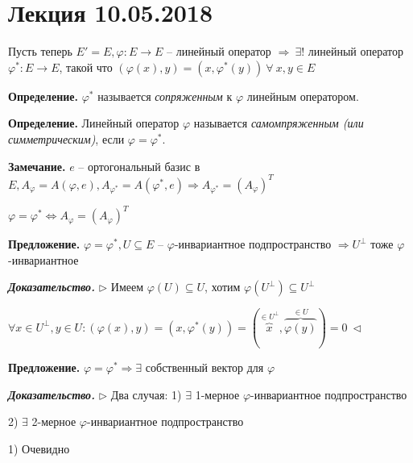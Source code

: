 \section{Лекция 10.05.2018}

Пусть теперь $E' = E, \varphi: E \rightarrow E$ -- линейный оператор $\Rightarrow \ \exists!$ линейный оператор $\varphi^*: E \rightarrow E$, такой что $(\varphi(x), y) = (x, \varphi^*(y)) \ \forall \ x, y \in E$

\vspace{\baselineskip}
\textbf{Определение.} $\varphi^*$ называется \textit{сопряженным} к $\varphi$ линейным оператором.

\vspace{\baselineskip}
\textbf{Определение.} Линейный оператор $\varphi$ называется \textit{самомпряженным (или симметрическим)}, если $\varphi = \varphi^*$.

\vspace{\baselineskip}
\textbf{Замечание.} $e$ -- ортогональный базис в $E, A_{\varphi} = A(\varphi, e), A_{\varphi^*} = A(\varphi^*, e) \Rightarrow A_{\varphi^*} = (A_{\varphi})^T$

$\varphi = \varphi^* \Leftrightarrow A_{\varphi} = (A_{\varphi})^T$

\vspace{\baselineskip}
\textbf{Предложение.} $\varphi = \varphi^*, U \subseteq E$ -- $\varphi$-инвариантное подпространство $\Rightarrow U^{\bot}$ тоже $\varphi$-инвариантное

\vspace{\baselineskip}
\textbf{\textit{Доказательство.}} $\rhd$ Имеем $\varphi(U) \subseteq U$, хотим $\varphi(U^{\bot}) \subseteq U^{\bot}$

$\forall x \in U^{\bot}, y \in U: (\varphi(x), y) = (x, \varphi^* (y)) = (\overbrace{x}^{\in U^{\bot}}, \overbrace{\varphi(y)}^{\in U}) = 0 \ \lhd$

\vspace{\baselineskip}
\textbf{Предложение.} $\varphi = \varphi^* \Rightarrow \exists$ собственный вектор для $\varphi$

\vspace{\baselineskip}
\textbf{\textit{Доказательство.}} $\rhd$ Два случая: 1) $\exists$ 1-мерное $\varphi$-инвариантное подпространство

2) $\exists$ 2-мерное $\varphi$-инвариантное подпространство

\vspace{\baselineskip}
1) Очевидно


